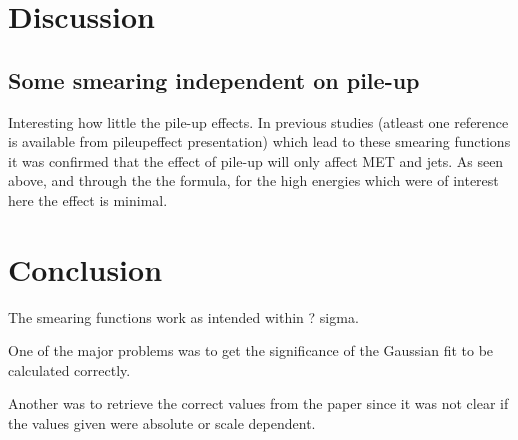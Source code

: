 \section{Discussion}
\subsection{Some smearing independent on pile-up}
Interesting how little the pile-up effects. In previous studies (atleast one reference is available from pileupeffect presentation) which lead to these smearing functions it was confirmed that the effect of pile-up will only affect MET and jets. As seen above, and through the the formula, for the high energies which were of interest here the effect is minimal. 


\section{Conclusion}
The smearing functions work as intended within ? sigma. 

One of the major problems was to get the significance of the Gaussian fit to be calculated correctly.

Another was to retrieve the correct values from the paper since it was not clear if the values given were absolute or scale dependent.